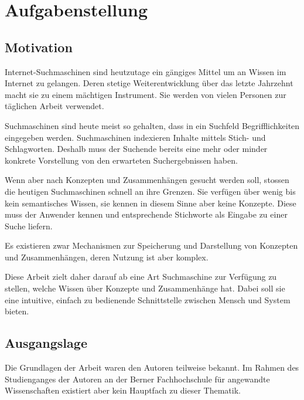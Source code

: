 \chapter{Aufgabenstellung}
\label{chap:Aufgabenstellung}


\section{Motivation}
\label{sec:aufgabe_motivation}
Internet-Suchmaschinen sind heutzutage ein gängiges Mittel um an Wissen im Internet zu gelangen. Deren stetige Weiterentwicklung über das letzte Jahrzehnt macht sie zu einem mächtigen Instrument. Sie werden von vielen Personen zur täglichen Arbeit verwendet.

Suchmaschinen sind heute meist so gehalten, dass in ein Suchfeld Begrifflichkeiten eingegeben werden. Suchmaschinen indexieren Inhalte mittels Stich- und Schlagworten. Deshalb muss der Suchende bereits eine mehr oder minder konkrete Vorstellung von den erwarteten Suchergebnissen haben.

Wenn aber nach Konzepten und Zusammenhängen gesucht werden soll, stossen die heutigen Suchmaschinen schnell an ihre Grenzen.  Sie verfügen über wenig bis kein semantisches Wissen, sie kennen in diesem Sinne aber keine Konzepte. Diese muss der Anwender kennen und entsprechende Stichworte als Eingabe zu einer Suche liefern.

Es existieren zwar Mechanismen zur Speicherung und Darstellung von Konzepten und Zusammenhängen, deren Nutzung ist aber komplex.

Diese Arbeit zielt daher darauf ab eine Art Suchmaschine zur Verfügung zu stellen, welche Wissen über Konzepte und Zusammenhänge hat. Dabei soll sie eine intuitive, einfach zu bedienende Schnittstelle zwischen Mensch und System bieten.

\section{Ausgangslage}
\label{sec:aufgabe_ausgangslage}
Die Grundlagen der Arbeit waren den Autoren teilweise bekannt. Im Rahmen des Studienganges der Autoren an der Berner Fachhochschule für angewandte Wissenschaften existiert aber kein Hauptfach zu dieser Thematik.

